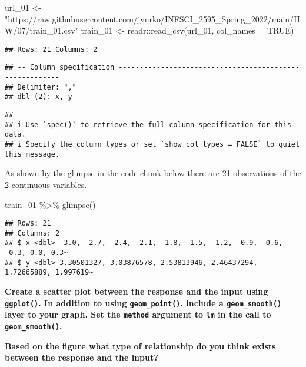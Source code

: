 \documentclass[
]{article}
\newenvironment{Shaded}{\begin{snugshade}}{\end{snugshade}}
\newcommand{\AttributeTok}[1]{\textcolor[rgb]{0.77,0.63,0.00}{#1}}
\newcommand{\ConstantTok}[1]{\textcolor[rgb]{0.00,0.00,0.00}{#1}}
\newcommand{\FunctionTok}[1]{\textcolor[rgb]{0.00,0.00,0.00}{#1}}
\newcommand{\NormalTok}[1]{#1}
\newcommand{\OtherTok}[1]{\textcolor[rgb]{0.56,0.35,0.01}{#1}}
\newcommand{\SpecialCharTok}[1]{\textcolor[rgb]{0.00,0.00,0.00}{#1}}
\newcommand{\StringTok}[1]{\textcolor[rgb]{0.31,0.60,0.02}{#1}}
\begin{document}
\begin{Shaded}
\begin{Highlighting}[]
\NormalTok{url\_01 }\OtherTok{\textless{}{-}} \StringTok{"https://raw.githubusercontent.com/jyurko/INFSCI\_2595\_Spring\_2022/main/HW/07/train\_01.csv"}
\NormalTok{train\_01 }\OtherTok{\textless{}{-}}\NormalTok{ readr}\SpecialCharTok{::}\FunctionTok{read\_csv}\NormalTok{(url\_01, }\AttributeTok{col\_names =} \ConstantTok{TRUE}\NormalTok{)}
\end{Highlighting}
\end{Shaded}

\begin{verbatim}
## Rows: 21 Columns: 2
\end{verbatim}

\begin{verbatim}
## -- Column specification --------------------------------------------------------
## Delimiter: ","
## dbl (2): x, y
\end{verbatim}

\begin{verbatim}
## 
## i Use `spec()` to retrieve the full column specification for this data.
## i Specify the column types or set `show_col_types = FALSE` to quiet this message.
\end{verbatim}

As shown by the glimpse in the code chunk below there are 21
observations of the 2 continuous variables.

\begin{Shaded}
\begin{Highlighting}[]
\NormalTok{train\_01 }\SpecialCharTok{\%\textgreater{}\%} \FunctionTok{glimpse}\NormalTok{()}
\end{Highlighting}
\end{Shaded}

\begin{verbatim}
## Rows: 21
## Columns: 2
## $ x <dbl> -3.0, -2.7, -2.4, -2.1, -1.8, -1.5, -1.2, -0.9, -0.6, -0.3, 0.0, 0.3~
## $ y <dbl> 3.30501327, 3.03876578, 2.53813946, 2.46437294, 1.72665889, 1.997619~
\end{verbatim}

\textbf{Create a scatter plot between the response and the input using
\texttt{ggplot()}. In addition to using \texttt{geom\_point()}, include
a \texttt{geom\_smooth()} layer to your graph. Set the \texttt{method}
argument to \texttt{\textquotesingle{}lm\textquotesingle{}} in the call
to \texttt{geom\_smooth()}.}

\textbf{Based on the figure what type of relationship do you think
exists between the response and the input?}
\end{document}
